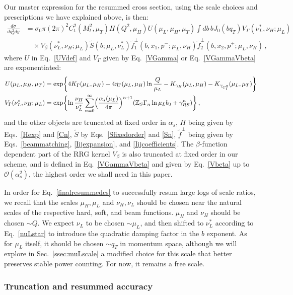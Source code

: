 \documentclass[a4,letterpaper,11pt]{article}
\newcommand{\nn}{\nonumber}
\newcommand{\as}{\alpha_s}
\newcommand{\cO}{\mathcal{O}}
\newcommand{\zed}{\mathbb{Z}}
\newcommand{\wt}{\widetilde}
\newcommand{\eq}[1]{Eq.~\eqref{#1}}
\newcommand{\eqs}[2]{Eqs.~\eqref{#1} and \eqref{#2}}
\newcommand{\eqss}[3]{Eqs.~\eqref{#1}, \eqref{#2}, and \eqref{#3}}
\newcommand{\ssec}[1]{Sec.~\ref{ssec:#1}}
\begin{document}
Our master expression for the resummed cross section, using the scale choices and prescriptions we have explained above, is then:
\begin{align}
\label{finalresummedcs}
 \frac{ d \sigma} {dq_T^2 dy} &= \sigma_0 \pi (2\pi)^2 C_t^2(M_t^2, \mu_T) H (Q^2,\mu_H ) U(\mu_L,\mu_H, \mu_T) \int db\, b J_0( b q_T) V_\Gamma(\nu_L^*,\nu_H;\mu_L)  \nn\\
 &\quad\times V_\beta(\nu_L^*,\nu_H;\mu_L)  \wt S( b ;\mu_L,\nu_L^*) \wt f_1^{\perp}( b, x_1,p^-; \mu_L ,\nu_H) \wt f_2^{\perp}(  b, x_2, p^+;  \mu_L ,\nu_H) \,, 
\end{align}
where $U$ in \eq{UVdef} and $V_\Gamma$ given by \eq{VGamma} or \eq{VGammaVbeta} are exponentiated:
\begin{align}
U(\mu_L,\mu_H, \mu_T) &= \exp\biggl\{4 K_\Gamma(\mu_L,\mu_H) - 4 \eta_\Gamma(\mu_L,\mu_H) \ln\frac{Q}{\mu_L} - K_{\gamma_H}(\mu_L,\mu_H)- K_{\gamma_{C_t^2}}(\mu_L,\mu_T)\biggr\}\nn \\
\label{Vstar}
V_\Gamma (\nu_L^*,\nu_H;\mu_L) &= \exp\biggl\{ \ln\frac{\nu_H}{\nu_L^*} \sum_{n=0}^\infty \Bigl(\frac{\as(\mu_L)}{4\pi}\Bigr)^{n+1}(\zed_S \Gamma_n \ln\mu_L b_0 + \gamma_{RS}^n)\biggr\}\,,
\end{align}
and the other objects are truncated at fixed order in $\as$, $H$ being given by \eqs{Hexp}{Cn}, $\wt S$ by \eqs{Sfixedorder}{Sn}, $\wt f^\perp$ being given by \eqss{beammatching}{Iijexpansion}{Iijcoefficients}. The $\beta$-function dependent part of the RRG kernel $V_\beta$ is also truncated at fixed order in our scheme, and is defined in \eq{VGammaVbeta} and given by \eq{Vbeta} up to $\cO(\as^2)$, the highest order we shall need in this paper.

In order for \eq{finalresummedcs} to successfully resum large logs of scale ratios, we recall that the scales $\mu_H,\mu_L$ and $\nu_H,\nu_L$ should be chosen near the natural scales of the respective hard, soft, and beam functions. $\mu_H$ and $\nu_H$ should be chosen $\sim Q$. We expect $\nu_L$ to be chosen $\sim \mu_L$, and then shifted to $\nu_L^*$ according to \eq{nuLstar} to introduce the quadratic damping factor in the $b$ exponent. As for $\mu_L$ itself, it should be chosen $\sim q_T$ in momentum space, although we will explore in \ssec{muLscale} a modified choice for this scale that better preserves stable power counting. For now, it remains a free scale.

\subsubsection{Truncation and resummed accuracy}
\end{document}
